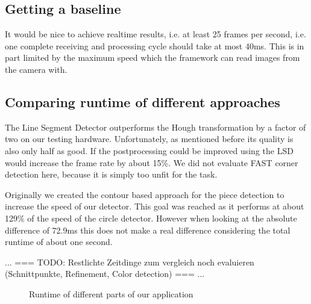 	\subsection{Getting a baseline}
	\label{evaluation-speed-baseline}
	It would be nice to achieve realtime results, i.e. at least 25 frames per second, i.e. one complete receiving and processing cycle should take at most 40ms. This is in part limited by the maximum speed which the framework can read images from the camera with. 

	\subsection{Comparing runtime of different approaches}
	\label{evaluation-speed-approaches}
	The Line Segment Detector outperforms the Hough transformation by a factor of two on our testing hardware. Unfortunately, as mentioned before its quality is also only half as good. If the postprocessing could be improved using the LSD would increase the frame rate by about 15\%. We did not evaluate FAST corner detection here, because it is simply too unfit for the task.

	Originally we created the contour based approach for the piece detection to increase the speed of our detector. This goal was reached as it performs at about 129\% of the speed of the circle detector. However when looking at the absolute difference of 72.9ms this does not make a real difference considering the total runtime of about one second.

	... === TODO: Restlichte Zeitdinge zum vergleich noch evaluieren (Schnittpunkte, Refinement, Color detection) === ...

	\datatable
	\begin{figure}
		\pgfplotsset{width=\textwidth, height=5cm, compat=1.11}
		\caption{Runtime of different parts of our application}
		\label{fig:timeEvaluation}
	\end{figure}



